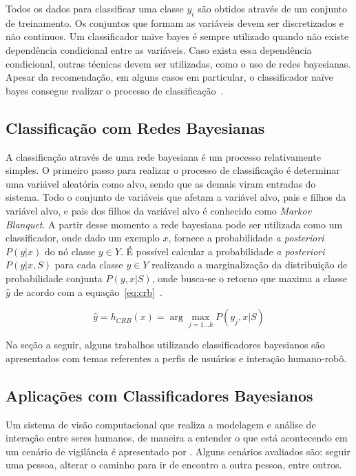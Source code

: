 Todos os dados para classificar uma classe $y_i$ são obtidos através de um conjunto de treinamento. Os conjuntos que formam as variáveis devem ser discretizados e não continuos. Um classificador naïve bayes é sempre utilizado quando não existe dependência condicional entre as variáveis. Caso exista essa dependência condicional, outras técnicas devem ser utilizadas, como o uso de redes bayesianas. Apesar da recomendação, em alguns casos em particular, o classificador naïve bayes consegue realizar o processo de classificação~\cite{faceli:2011}.

\subsection{Classificação com Redes Bayesianas}
\label{sec:rbclassificador}

A classificação através de uma rede bayesiana é um processo relativamente simples. O primeiro passo para realizar o processo de classificação é determinar uma variável aleatória como alvo, sendo que as demais viram entradas do sistema. Todo o conjunto de variáveis que afetam a variável alvo, pais e filhos da variável alvo, e pais dos filhos da variável alvo é conhecido como \emph{Markov Blanquet}. A partir desse momento a rede bayesiana pode ser utilizada como um classificador, onde dado um exemplo $x$, fornece a probabilidade \emph{a posteriori} $P(y | x)$ do nó classe $y \in Y$. É possível calcular a probabilidade \emph{a posteriori} $P(y|x,S)$ para cada classe $y \in Y$ realizando a marginalização da distribuição de probabilidade conjunta $P(y,x|S)$, onde busca-se o retorno que maxima a classe $\hat{y}$ de acordo com a equação~\ref{eq:crb}~\cite{faceli:2011}.

\begin{equation}
    \label{eq:crb}
    \hat{y} = h_{CRB}(x) = \arg \max_{j=1 \dots k} P(y_j, x | S)
\end{equation}

Na seção a seguir, alguns trabalhos utilizando classificadores bayesianos são apresentados com temas referentes a perfis de usuários e interação humano-robô.

\subsection{Aplicações com Classificadores Bayesianos}
\label{sec:cbrw}

Um sistema de visão computacional que realiza a modelagem e análise de interação entre seres humanos, de maneira a entender o que está acontecendo em um cenário de vigilância é apresentado por . Alguns cenários avaliados são: seguir uma pessoa, alterar o caminho para ir de encontro a outra pessoa, entre outros.

